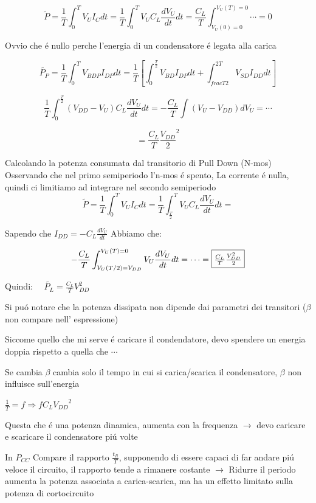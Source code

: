 \documentclass{article}
\begin{document}
\[
    \tilde{P} = \frac{1}{T}\int_0^T  V_U I_C dt = \frac{1}{T} \int_0^T V_U C_L \frac{dV_U}{dt} dt =
    \frac{C_L}{T}\int_{V_U(0)=0}^{V_U(T) = 0} \cdots = 0
\]

Ovvio che \'e nullo perche l'energia di un condensatore \'e legata alla carica

\[
    \tilde{P_P} = \frac{1}{T} \int_0^T V_{BDP} I_{DP} dt = \frac{1}{T}\left[ \int_0^{\frac{T}{2}} V_{BD} I_{DP} dt + \int_{frac{T}{2}}^{2T} V_{SD}I_{DD}dt\right]
\]


\[
    \frac{1}{T} \int_0^{\frac{T}{2}} (V_{DD} - V_U) C_L \frac{dV_U}{dt}dt = -\frac{C_L}{T} \int (V_U - V_{DD}) dV_U = \cdots
\]

\[
    =\frac{C_L}{T} \frac{V_{DD}}{2}^2
\]

Calcolando la potenza consumata dal transitorio di Pull Down (N-mos)
Osservando che nel primo semiperiodo l'n-mos \'e spento, La corrente \'e nulla, quindi ci limitiamo ad integrare nel secondo semiperiodo
\[
    \tilde{P} = \frac{1}{T}\int_0^T  V_U I_C dt = \frac{1}{T} \int_{\frac{T}{2}}^T V_U C_L \frac{dV_U}{dt} dt =
\]

Sapendo che $I_{DD} = -C_L\frac{dV_U}{dt}$ Abbiamo che:

\[
    -\frac{C_L}{T} \int_{V_U(T/2) = V_{DD}} ^ {V_U(T) = 0} V_U \frac{dV_U}{dt} dt = \cdots = \framebox{$\frac{C_L}{T} \frac{V_{DD}^2}{2}$}
\]

Quindi: $\quad \tilde{P_L} = \frac{C_L}{T} {V_{DD}^2} $

Si pu\'o notare che la potenza dissipata non dipende dai parametri dei transitori ($\beta$ non compare nell' espressione)

Siccome quello che mi serve \'e caricare il condendatore, devo spendere un energia doppia rispetto a quella che $\cdots$

Se cambia $\beta$ cambia solo il tempo in cui si carica/scarica il condensatore, $\beta$ non influisce sull'energia

$ \frac{1}{T} = f  \Rightarrow  f C_L {V_{DD}}^2$

Questa che \'e una potenza dinamica, aumenta con la frequenza $\rightarrow$ devo caricare e scaricare il condensatore pi\'u volte

In $P_{CC}$ Compare il rapporto  $\frac{t_R}{T}$, supponendo di essere capaci di far andare pi\'u veloce il circuito, il rapporto tende a rimanere costante $\rightarrow$ Ridurre il periodo aumenta la potenza associata a carica-scarica, ma ha un effetto limitato sulla potenza di cortocircuito
\end{document}

